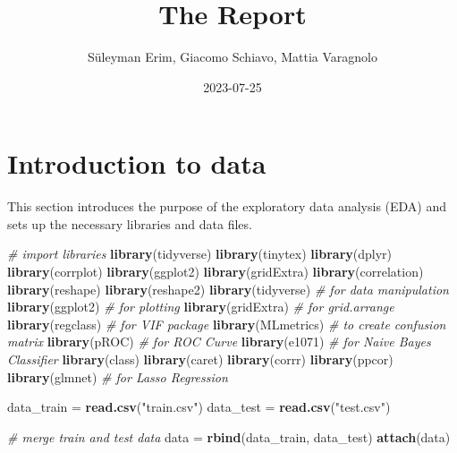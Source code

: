 \documentclass[
]{article}
\title{The Report}
\author{Süleyman Erim, Giacomo Schiavo, Mattia Varagnolo}
\date{2023-07-25}
\newenvironment{Shaded}{\begin{snugshade}}{\end{snugshade}}
\newcommand{\CommentTok}[1]{\textcolor[rgb]{0.56,0.35,0.01}{\textit{#1}}}
\newcommand{\FunctionTok}[1]{\textcolor[rgb]{0.13,0.29,0.53}{\textbf{#1}}}
\newcommand{\NormalTok}[1]{#1}
\newcommand{\OtherTok}[1]{\textcolor[rgb]{0.56,0.35,0.01}{#1}}
\newcommand{\StringTok}[1]{\textcolor[rgb]{0.31,0.60,0.02}{#1}}
\begin{document}
\maketitle

\hypertarget{introduction-to-data}{%
\section{Introduction to data}\label{introduction-to-data}}

This section introduces the purpose of the exploratory data analysis
(EDA) and sets up the necessary libraries and data files.

\begin{Shaded}
\begin{Highlighting}[]
\CommentTok{\# import libraries}
\FunctionTok{library}\NormalTok{(tidyverse)}
\FunctionTok{library}\NormalTok{(tinytex)}
\FunctionTok{library}\NormalTok{(dplyr)}
\FunctionTok{library}\NormalTok{(corrplot)}
\FunctionTok{library}\NormalTok{(ggplot2)}
\FunctionTok{library}\NormalTok{(gridExtra)}
\FunctionTok{library}\NormalTok{(correlation)}
\FunctionTok{library}\NormalTok{(reshape)}
\FunctionTok{library}\NormalTok{(reshape2)}
\FunctionTok{library}\NormalTok{(tidyverse) }\CommentTok{\# for data manipulation}
\FunctionTok{library}\NormalTok{(ggplot2) }\CommentTok{\# for plotting}
\FunctionTok{library}\NormalTok{(gridExtra) }\CommentTok{\# for grid.arrange}
\FunctionTok{library}\NormalTok{(regclass) }\CommentTok{\# for VIF package}
\FunctionTok{library}\NormalTok{(MLmetrics) }\CommentTok{\# to create confusion matrix}
\FunctionTok{library}\NormalTok{(pROC) }\CommentTok{\# for ROC Curve}
\FunctionTok{library}\NormalTok{(e1071) }\CommentTok{\# for Naive Bayes Classifier}
\FunctionTok{library}\NormalTok{(class)}
\FunctionTok{library}\NormalTok{(caret)}
\FunctionTok{library}\NormalTok{(corrr)}
\FunctionTok{library}\NormalTok{(ppcor)}
\FunctionTok{library}\NormalTok{(glmnet) }\CommentTok{\# for Lasso Regression}
\end{Highlighting}
\end{Shaded}

\begin{Shaded}
\begin{Highlighting}[]
\NormalTok{data\_train }\OtherTok{=} \FunctionTok{read.csv}\NormalTok{(}\StringTok{"train.csv"}\NormalTok{)}
\NormalTok{data\_test }\OtherTok{=} \FunctionTok{read.csv}\NormalTok{(}\StringTok{"test.csv"}\NormalTok{)}

\CommentTok{\# merge train and test data}
\NormalTok{data }\OtherTok{=} \FunctionTok{rbind}\NormalTok{(data\_train, data\_test)}
\FunctionTok{attach}\NormalTok{(data)}
\end{Highlighting}
\end{Shaded}
\end{document}
